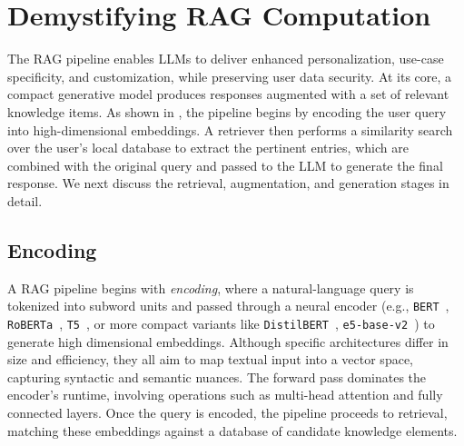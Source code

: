 \section{Demystifying RAG Computation}
\label{sec:02BGnMotivation}
%

The RAG pipeline enables LLMs to deliver enhanced personalization, use-case specificity, and customization, while preserving user data security. At its core, a compact generative model produces responses augmented with a set of \topk{} relevant knowledge items. As shown in , the pipeline begins by encoding the user query into high-dimensional embeddings. A retriever then performs a similarity search over the user’s local database to extract the \topk{} pertinent entries, which are combined with the original query and passed to the LLM to generate the final response. We next discuss the retrieval, augmentation, and generation stages in detail.


\subsection{Encoding}
\label{sec:BG:Encoding}
A RAG pipeline begins with \emph{encoding}, where a natural-language query is tokenized into subword units and passed through a neural encoder (e.g., \texttt{BERT}~\cite{devlin2019bert}, \texttt{RoBERTa}~\cite{liu2019roberta}, \texttt{T5}~\cite{raffel2020exploring}, or more compact variants like
\texttt{DistilBERT}~\cite{sanh2019distilbert}, \texttt{e5-base-v2}~\cite{wang2022text}) to generate high dimensional embeddings. Although specific architectures differ in size and efficiency, they all aim to map textual input into a vector space, capturing syntactic and semantic nuances. The forward pass dominates the encoder’s runtime, involving operations such as multi-head attention and fully connected layers. Once the query is encoded, the pipeline proceeds to retrieval, matching these embeddings against a database of candidate knowledge elements.


